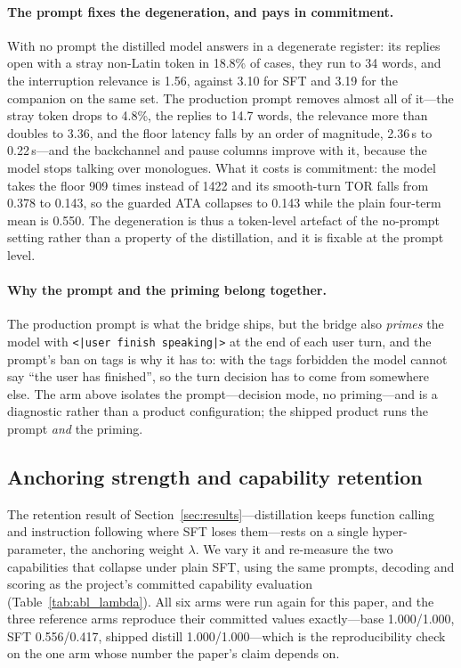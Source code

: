 \documentclass[conference]{IEEEtran}
\begin{document}
\paragraph{The prompt fixes the degeneration, and pays in commitment.} With no
prompt the distilled model answers in a degenerate register: its replies open
with a stray non-Latin token in 18.8\% of cases, they run to 34 words, and the
interruption relevance is 1.56, against 3.10 for SFT and 3.19 for the
companion on the same set. The
production prompt removes almost all of it---the stray token drops to 4.8\%, the
replies to 14.7 words, the relevance more than doubles to 3.36, and the floor
latency falls by an order of magnitude, 2.36\,s to 0.22\,s---and the backchannel
and pause columns improve with it, because the model stops talking over
monologues. What it costs is commitment: the model takes the floor 909 times
instead of 1422 and its smooth-turn TOR falls from 0.378 to 0.143, so the
guarded ATA collapses to 0.143 while the plain four-term mean is 0.550. The
degeneration is thus a token-level artefact of the no-prompt setting rather than
a property of the distillation, and it is fixable at the prompt level.

\paragraph{Why the prompt and the priming belong together.} The production
prompt is what the bridge ships, but the bridge also \emph{primes} the model
with \texttt{<|user finish speaking|>} at the end of each user turn, and the
prompt's ban on tags is why it has to: with the tags forbidden the model cannot
say ``the user has finished'', so the turn decision has to come from somewhere
else. The arm above isolates the prompt---decision mode, no priming---and is a
diagnostic rather than a product configuration; the shipped product runs the
prompt \emph{and} the priming.

\subsection{Anchoring strength and capability retention}
\label{sec:abl_lambda}
The retention result of Section~\ref{sec:results}---distillation keeps function
calling and instruction following where SFT loses them---rests on a single
hyper-parameter, the anchoring weight $\lambda$. We vary it and re-measure the two
capabilities that collapse under plain SFT, using the same prompts, decoding and
scoring as the project's committed capability evaluation
(Table~\ref{tab:abl_lambda}). All six arms were run again for this paper, and the
three reference arms reproduce their committed values exactly---base
1.000/1.000, SFT 0.556/0.417, shipped distill 1.000/1.000---which is the
reproducibility check on the one arm whose number the paper's claim depends on.
\end{document}
